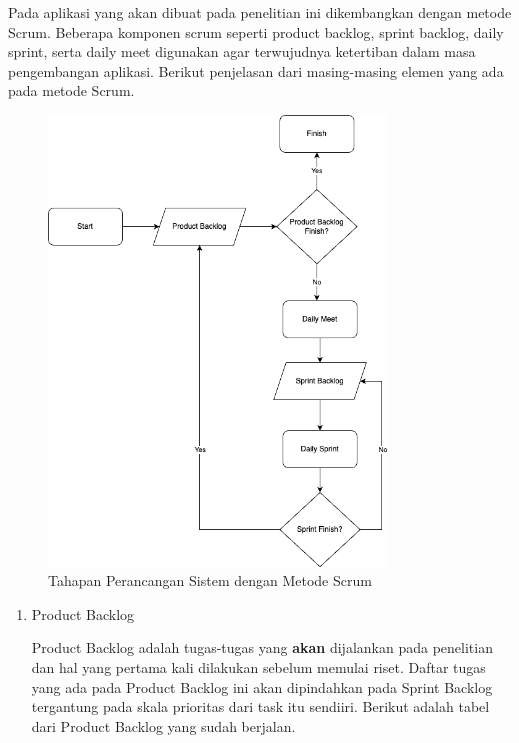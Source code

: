 \begin{spacing}{1.5}
Pada aplikasi yang akan dibuat pada penelitian ini dikembangkan dengan metode Scrum. Beberapa komponen scrum seperti product backlog, sprint backlog, daily sprint, serta daily meet digunakan agar terwujudnya ketertiban dalam masa pengembangan aplikasi. Berikut penjelasan dari masing-masing elemen yang ada pada metode Scrum.

\begin{figure}[H]
	\centering
	\includegraphics[width=0.8\textwidth]{gambar/scrum.png}
	\caption{Tahapan Perancangan Sistem dengan Metode Scrum}
\end{figure}

\begin{enumerate}
	\item Product Backlog
	
	Product Backlog adalah tugas-tugas yang \textbf{akan} dijalankan pada penelitian dan hal yang pertama kali dilakukan sebelum memulai riset. Daftar tugas yang ada pada Product Backlog ini akan dipindahkan pada Sprint Backlog tergantung pada skala prioritas dari task itu sendiiri. Berikut adalah tabel dari Product Backlog yang sudah berjalan.


\end{enumerate}
\end{spacing}
